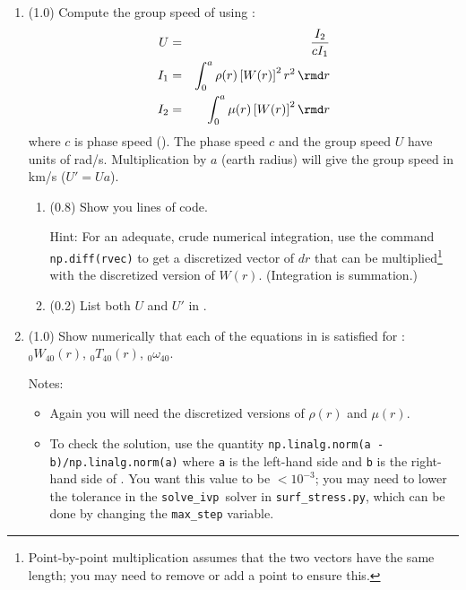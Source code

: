\documentclass[11pt,titlepage,fleqn]{article}
\newcommand{\tfiless}{{\tt surf\_stress.py}}
\newcommand{\sfind}{{\tt solve\_ivp}}
\begin{document}
\begin{enumerate}

\item (1.0) Compute the group speed of  using \citep[][Eq. 11.67]{DT}:
%
\begin{eqnarray}
U &=& \frac{I_2}{cI_1}
\label{group}
\\
I_1 &=& \int_0^a \rho(r) \left[W(r)\right]^2 r^2 \, \rmd r
\\
I_2 &=& \int_0^a \mu(r) \left[W(r)\right]^2 \rmd r
\end{eqnarray}
%
where $c$ is phase speed (). %
The phase speed $c$ and the group speed $U$ have units of rad/s. Multiplication by $a$ (earth radius) will give the group speed in km/s ($U' = Ua$).
%
\begin{enumerate}
\item (0.8) Show you lines of code.

Hint: For an adequate, crude numerical integration, use the command \verb+np.diff(rvec)+ to get a discretized vector of $dr$ that can be multiplied\footnote{Point-by-point multiplication assumes that the two vectors have the same length; you may need to remove or add a point to ensure this.} with the discretized version of $W(r)$. (Integration is summation.)

\item (0.2) List both $U$ and $U'$ in .
\end{enumerate}

\label{prob:0T40_cubic_group}

\item (1.0) Show numerically that each of the equations in  is satisfied for : $_0W_{40}(r)$, $_0T_{40}(r)$, $_0\omega_{40}$.

Notes:
%
\begin{itemize}
\item Again you will need the discretized versions of $\rho(r)$ and $\mu(r)$.

\item To check the solution, use the quantity \verb+np.linalg.norm(a - b)/np.linalg.norm(a)+ where \verb+a+ is the left-hand side and \verb+b+ is the right-hand side of . You want this value to be $< 10^{-3}$; you may need to lower the tolerance in the \sfind\ solver in \tfiless, which can be done by changing the \verb+max_step+ variable.


\end{itemize}
\end{enumerate}
\end{document}
